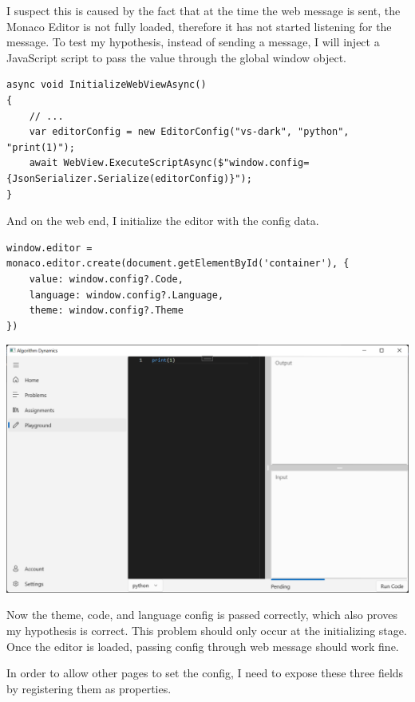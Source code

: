 \documentclass[a4paper]{report}
\begin{document}
I suspect this is caused by the fact that at the time the web message is sent, the Monaco Editor is not fully loaded, therefore it has not started listening for the message. To test my hypothesis, instead of sending a message, I will inject a JavaScript script to pass the value through the global window object.

\begin{verbatim}
async void InitializeWebViewAsync()
{
    // ...
    var editorConfig = new EditorConfig("vs-dark", "python", "print(1)");
    await WebView.ExecuteScriptAsync($"window.config={JsonSerializer.Serialize(editorConfig)}");
}
\end{verbatim}

And on the web end, I initialize the editor with the config data.

\begin{verbatim}
window.editor = monaco.editor.create(document.getElementById('container'), {
    value: window.config?.Code,
    language: window.config?.Language,
    theme: window.config?.Theme
})
\end{verbatim}

\includegraphics[width=\textwidth, height=\textheight, keepaspectratio]{PlaygroundPage-EditorConfig-Loading}

Now the theme, code, and language config is passed correctly, which also proves my hypothesis is correct. This problem should only occur at the initializing stage. Once the editor is loaded, passing config through web message should work fine.

In order to allow other pages to set the config, I need to expose these three fields by registering them as properties.
\end{document}
